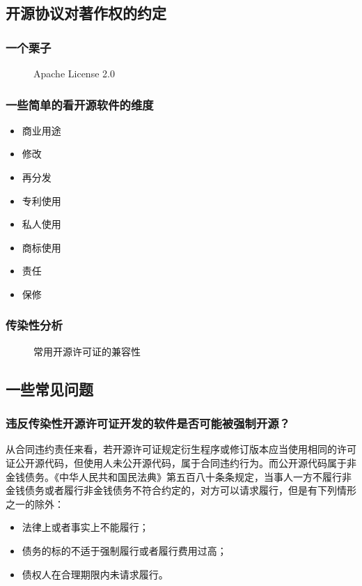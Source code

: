\documentclass[xcolor=table,dvipsnames,svgnames,aspectratio=169]{ctexbeamer}
\begin{document}
\subsection{开源协议对著作权的约定}

\begin{frame}
  \frametitle{一个栗子}
  \begin{figure}
    \centering
    \caption{Apache License 2.0}
  \end{figure}
  
\end{frame}

\begin{frame}
  \frametitle{一些简单的看开源软件的维度}
  \begin{itemize}
    \item 商业用途
    \item 修改
    \item 再分发
    \item 专利使用
    \item 私人使用
    \item 商标使用
    \item 责任
    \item 保修
  \end{itemize}
\end{frame}

\begin{frame}
  \frametitle{传染性分析}
  \begin{figure}
    \centering
    \caption{常用开源许可证的兼容性}
  \end{figure}
\end{frame}

\subsection{一些常见问题}

\begin{frame}
  \frametitle{违反传染性开源许可证开发的软件是否可能被强制开源？}
  从合同违约责任来看，若开源许可证规定衍生程序或修订版本应当使用相同的许可证公开源代码，但使用人未公开源代码，属于合同违约行为。而公开源代码属于非金钱债务。《中华人民共和国民法典》第五百八十条条规定，当事人一方不履行非金钱债务或者履行非金钱债务不符合约定的，对方可以请求履行，但是有下列情形之一的除外：

  \begin{itemize}
    \item 法律上或者事实上不能履行；
    \item 债务的标的不适于强制履行或者履行费用过高；
    \item 债权人在合理期限内未请求履行。
  \end{itemize}
  
\end{frame}
\end{document}
